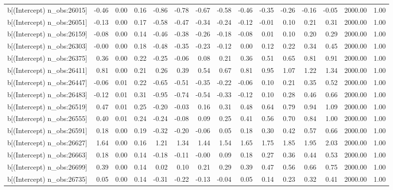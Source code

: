 \begin{table}[ht]
\begin{tabular}{rrrrrrrrrrrrrrr}
  b[(Intercept) n\_obs:26015] & -0.46 & 0.00 & 0.16 & -0.86 & -0.78 & -0.67 & -0.58 & -0.46 & -0.35 & -0.26 & -0.16 & -0.05 & 2000.00 & 1.00 \\ 
  b[(Intercept) n\_obs:26051] & -0.13 & 0.00 & 0.17 & -0.58 & -0.47 & -0.34 & -0.24 & -0.12 & -0.01 & 0.10 & 0.21 & 0.31 & 2000.00 & 1.00 \\ 
  b[(Intercept) n\_obs:26159] & -0.08 & 0.00 & 0.14 & -0.46 & -0.38 & -0.26 & -0.18 & -0.08 & 0.01 & 0.10 & 0.20 & 0.29 & 2000.00 & 1.00 \\ 
  b[(Intercept) n\_obs:26303] & -0.00 & 0.00 & 0.18 & -0.48 & -0.35 & -0.23 & -0.12 & 0.00 & 0.12 & 0.22 & 0.34 & 0.45 & 2000.00 & 1.00 \\ 
  b[(Intercept) n\_obs:26375] & 0.36 & 0.00 & 0.22 & -0.25 & -0.06 & 0.08 & 0.21 & 0.36 & 0.51 & 0.65 & 0.81 & 0.91 & 2000.00 & 1.00 \\ 
  b[(Intercept) n\_obs:26411] & 0.81 & 0.00 & 0.21 & 0.26 & 0.39 & 0.54 & 0.67 & 0.81 & 0.95 & 1.07 & 1.22 & 1.34 & 2000.00 & 1.00 \\ 
  b[(Intercept) n\_obs:26447] & -0.06 & 0.01 & 0.22 & -0.65 & -0.51 & -0.35 & -0.22 & -0.06 & 0.10 & 0.21 & 0.35 & 0.52 & 2000.00 & 1.00 \\ 
  b[(Intercept) n\_obs:26483] & -0.12 & 0.01 & 0.31 & -0.95 & -0.74 & -0.54 & -0.33 & -0.12 & 0.10 & 0.28 & 0.46 & 0.66 & 2000.00 & 1.00 \\ 
  b[(Intercept) n\_obs:26519] & 0.47 & 0.01 & 0.25 & -0.20 & -0.03 & 0.16 & 0.31 & 0.48 & 0.64 & 0.79 & 0.94 & 1.09 & 2000.00 & 1.00 \\ 
  b[(Intercept) n\_obs:26555] & 0.40 & 0.01 & 0.24 & -0.24 & -0.08 & 0.09 & 0.25 & 0.41 & 0.56 & 0.70 & 0.84 & 1.00 & 2000.00 & 1.00 \\ 
  b[(Intercept) n\_obs:26591] & 0.18 & 0.00 & 0.19 & -0.32 & -0.20 & -0.06 & 0.05 & 0.18 & 0.30 & 0.42 & 0.57 & 0.66 & 2000.00 & 1.00 \\ 
  b[(Intercept) n\_obs:26627] & 1.64 & 0.00 & 0.16 & 1.21 & 1.34 & 1.44 & 1.54 & 1.65 & 1.75 & 1.85 & 1.95 & 2.03 & 2000.00 & 1.00 \\ 
  b[(Intercept) n\_obs:26663] & 0.18 & 0.00 & 0.14 & -0.18 & -0.11 & -0.00 & 0.09 & 0.18 & 0.27 & 0.36 & 0.44 & 0.53 & 2000.00 & 1.00 \\ 
  b[(Intercept) n\_obs:26699] & 0.39 & 0.00 & 0.14 & 0.02 & 0.10 & 0.21 & 0.29 & 0.39 & 0.47 & 0.56 & 0.66 & 0.75 & 2000.00 & 1.00 \\ 
  b[(Intercept) n\_obs:26735] & 0.05 & 0.00 & 0.14 & -0.31 & -0.22 & -0.13 & -0.04 & 0.05 & 0.14 & 0.23 & 0.32 & 0.41 & 2000.00 & 1.00 \\ 

\end{tabular}
\end{table}
